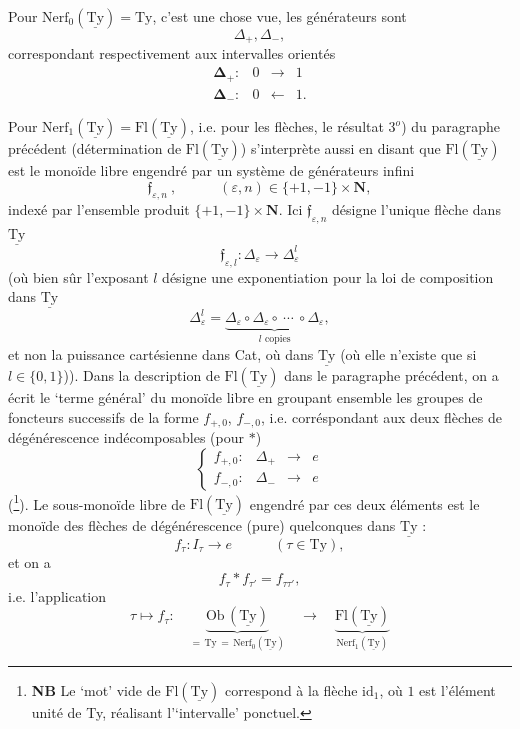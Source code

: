 \documentclass[11pt]{article}
\newcommand{\printedpage}[1]{\marginpar{\footnotesize p.~#1}}
\newcommand{\msp}[1]{\marginpar{\footnotesize [#1]}}
\newcommand{\uTy}{\underline{\mathrm{Ty}}}
\begin{document}
Pour $\mathrm{Nerf}_0(\uTy) = \mathrm{Ty}$, c'est une chose vue, les générateurs sont
\[
\Delta_+,\Delta_-,
\]
correspondant respectivement aux intervalles orientés
\[
\begin{array}{rccc}
\boldsymbol{\Delta}_+ : & 0 & \longrightarrow & 1\\[4pt]
\boldsymbol{\Delta}_- : & 0 & \longleftarrow & 1.
\end{array}
\]

\msp{page 50$'$}
Pour $\mathrm{Nerf}_1(\uTy) = \mathrm{Fl}(\uTy)$, i.e. pour les flèches, le résultat $3^o$) du paragraphe précédent (détermination de $\mathrm{Fl}(\uTy)$) s'interprète aussi en disant que $\mathrm{Fl}(\uTy)$ est le monoïde libre engendré par un système de générateurs infini
\[
\mathfrak{f}_{\varepsilon,n}\ , \qquad\quad (\varepsilon,n)\in\{+1,-1\}\times\mathbf{N},
\]
indexé par l'ensemble produit $\{+1,-1\}\times\mathbf{N}$. Ici $\mathfrak{f}_{\varepsilon,n}$ désigne l'unique flèche dans $\uTy$
\[
\mathfrak{f}_{\varepsilon,l} : \Delta_\varepsilon \longrightarrow \Delta^l_\varepsilon
\]
(où bien sûr l'exposant $l$ désigne une exponentiation pour la loi de composition dans $\uTy$
\[
\Delta^l_\varepsilon = \underbrace{\Delta_\varepsilon\circ\Delta_\varepsilon\circ\ \cdots\ \circ\Delta_\varepsilon}_{l\text{ copies}},
\]
et non la puissance cartésienne dans Cat, où dans $\uTy$ (où elle n'existe que si $l\in\{0,1\}$)). %
Dans la description de $\mathrm{Fl}(\uTy)$ dans le paragraphe précédent, on a écrit le `terme général' du monoïde libre en groupant ensemble les groupes de foncteurs successifs de la forme $f_{+,0}$, $f_{-,0}$, i.e. corréspondant aux deux flèches de dégénérescence indécomposables (pour $*$) %
\[
\left\{
\begin{array}{lccc}
f_{+,0} : & \Delta_+ & \longrightarrow & e\\[4pt]
f_{-,0} : & \Delta_- & \longrightarrow & e
\end{array}
\right.
\]
(\footnote[15]{\textbf{NB} Le `mot' vide de $\mathrm{Fl}(\uTy)$ correspond à la flèche $\mathrm{id}_1$, où $1$ est l'élément unité de Ty, réalisant l'`intervalle' ponctuel.}). Le sous-monoïde libre de $\mathrm{Fl}(\uTy)$ engendré par ces deux éléments est le monoïde des flèches de dégénérescence (pure) quelconques
\printedpage{35}
\msp{page 51}
dans $\uTy$ :
\[
f_\tau : I_\tau \longrightarrow e \qquad\quad (\tau\in\mathrm{Ty}),
\]
et on a
\[
f_\tau * f_{\tau'} = f_{\tau\tau'},
\]
i.e. l'application
\[
\tau \longmapsto f_\tau :\quad \underbrace{\mathrm{Ob}\,(\uTy)}_{=\,\mathrm{Ty}\,=\,\mathrm{Nerf}_0(\uTy)} \quad\longrightarrow\quad \underbrace{\mathrm{Fl}(\uTy)}_{\mathrm{Nerf}_1(\uTy)}
\]
\end{document}
